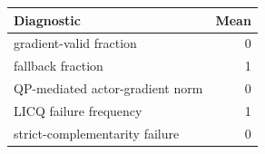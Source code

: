 \begin{tabular}{lr}
\toprule
Diagnostic & Mean \\
\midrule
gradient-valid fraction & 0 \\
fallback fraction & 1 \\
QP-mediated actor-gradient norm & 0 \\
LICQ failure frequency & 1 \\
strict-complementarity failure & 0 \\
\bottomrule
\end{tabular}
